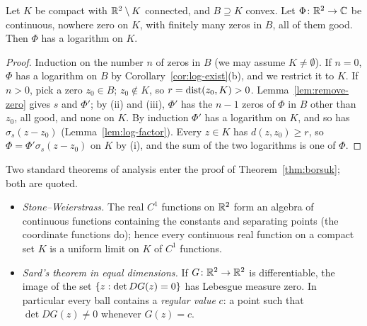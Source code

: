 
\begin{lemma}\label{lem:zeros-induction}
Let $K$ be compact with $\mathbb{R}^2\setminus K$ connected, and $B\supseteq K$ convex. Let $\Phi\colon\mathbb{R}^2\to\mathbb{C}$
be continuous, nowhere zero on $K$, with finitely many zeros in $B$, all of them good. Then $\Phi$
has a logarithm on $K$.
\end{lemma}

\begin{proof}
Induction on the number $n$ of zeros in $B$ (we may assume $K\neq\emptyset$). If $n=0$, $\Phi$ has a
logarithm on $B$ by Corollary~\ref{cor:log-exist}(b), and we restrict it to $K$. If $n>0$, pick a
zero $z_0\in B$; $z_0\notin K$, so $r=\operatorname{dist}(z_0,K)>0$. Lemma~\ref{lem:remove-zero} gives $s$ and
$\Phi'$; by (ii) and (iii), $\Phi'$ has the $n-1$ zeros of $\Phi$ in $B$ other than $z_0$, all good,
and none on $K$. By induction $\Phi'$ has a logarithm on $K$, and so has $\sigma_s(z-z_0)$
(Lemma~\ref{lem:log-factor}). Every $z\in K$ has $d(z,z_0)\ge r$, so $\Phi=\Phi'\sigma_s(z-z_0)$ on $K$
by (i), and the sum of the two logarithms is one of $\Phi$.
\end{proof}


Two standard theorems of analysis enter the proof of Theorem~\ref{thm:borsuk}; both are quoted.
\begin{itemize}
\item \emph{Stone--Weierstrass.} The real $C^1$ functions on $\mathbb{R}^2$ form an algebra of continuous
functions containing the constants and separating points (the coordinate functions do); hence every
continuous real function on a compact set $K$ is a uniform limit on $K$ of $C^1$ functions.
\item \emph{Sard's theorem in equal dimensions.} If $G\colon\mathbb{R}^2\to\mathbb{R}^2$ is differentiable, the image
of the set $\left\{ z:\det DG(z)=0 \right\}$ has Lebesgue measure zero. In particular every ball contains a
\emph{regular value} $c$: a point such that $\det DG(z)\neq0$ whenever $G(z)=c$.
\end{itemize}



